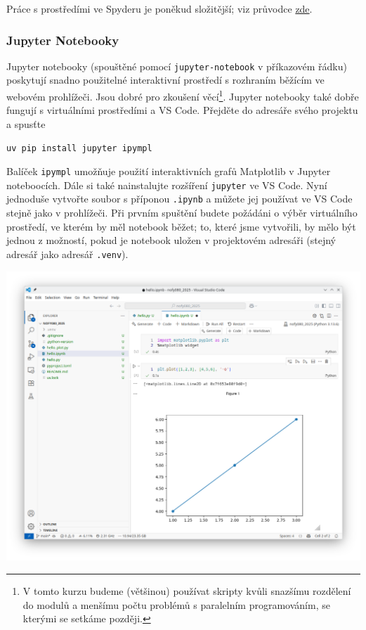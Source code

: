 Práce s prostředími ve Spyderu je poněkud složitější; viz průvodce \href{https://github.com/spyder-ide/spyder/wiki/Working-with-packages-and-environments-in-Spyder#working-with-other-environments-and-python-installations}{zde}.

\subsubsection{Jupyter Notebooky}
Jupyter notebooky (spouštěné pomocí \verb|jupyter-notebook| v příkazovém řádku) poskytují snadno použitelné interaktivní prostředí s rozhraním běžícím ve webovém prohlížeči. Jsou dobré pro zkoušení věcí\footnote{V tomto kurzu budeme (většinou) používat skripty kvůli snazšímu rozdělení do modulů a menšímu počtu problémů s paralelním programováním, se kterými se setkáme později.}. Jupyter notebooky také dobře fungují s virtuálními prostředími a VS Code. Přejděte do adresáře svého projektu a spusťte
\begin{lstlisting}
uv pip install jupyter ipympl
\end{lstlisting}
Balíček \verb|ipympl| umožňuje použití interaktivních grafů Matplotlib v Jupyter noteboocích. Dále si také nainstalujte rozšíření \verb|jupyter| ve VS Code. Nyní jednoduše vytvořte soubor s příponou \verb|.ipynb| a můžete jej používat ve VS Code stejně jako v prohlížeči. Při prvním spuštění budete požádáni o výběr virtuálního prostředí, ve kterém by měl notebook běžet; to, které jsme vytvořili, by mělo být jednou z možností, pokud je notebook uložen v projektovém adresáři (stejný adresář jako adresář \verb|.venv|).

\begin{center}
    \includegraphics[width=0.9\linewidth]{vscode_jupyter.png}
\end{center}